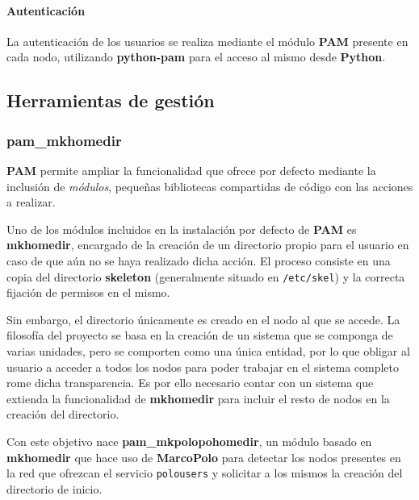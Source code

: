\paragraph{Autenticación}

La autenticación de los usuarios se realiza mediante el módulo \textbf{PAM} presente en cada nodo\citationneeded{}, utilizando \textbf{python-pam} para el acceso al mismo desde \textbf{Python}\cite{python-am}.


\subsection{Herramientas de gestión}

\subsubsection{pam\_mkhomedir}
\label{pam_mkpolohomedir}

\textbf{PAM} permite ampliar la funcionalidad que ofrece por defecto mediante la inclusión de \textit{módulos}, pequeñas bibliotecas compartidas de código con las acciones a realizar.

Uno de los módulos incluidos en la instalación por defecto de \textbf{PAM} es \textbf{mkhomedir}, encargado de la creación de un directorio propio para el usuario en caso de que aún no se haya realizado dicha acción. El proceso consiste en una copia del directorio \textbf{skeleton} (generalmente situado en \texttt{/etc/skel}) y la correcta fijación de permisos en el mismo.

Sin embargo, el directorio únicamente es creado en el nodo al que se accede. La filosofía del proyecto se basa en la creación de un sistema que se componga de varias unidades, pero se comporten como una única entidad, por lo que obligar al usuario a acceder a todos los nodos para poder trabajar en el sistema completo rome dicha transparencia. Es por ello necesario contar con un sistema que extienda la funcionalidad de \textbf{mkhomedir} para incluir el resto de nodos en la creación del directorio.

Con este objetivo nace \textbf{pam\_mkpolopohomedir}, un módulo basado en \textbf{mkhomedir} que hace uso de \textbf{MarcoPolo} para detectar los nodos presentes en la red que ofrezcan el servicio \texttt{polousers} y solicitar a los mismos la creación del directorio de inicio.

